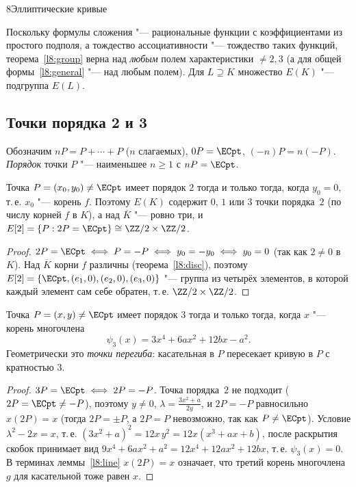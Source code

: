 \begin{lecture}{8}{Эллиптические кривые}
\begin{remark}
Поскольку формулы сложения "--- рациональные функции с коэффициентами из простого подполя,
а тождество ассоциативности "--- тождество таких функций, теорема~\ref{l8:group} верна над
\emph{любым} полем характеристики $\ne 2, 3$ (а для общей формы~\eqref{l8:general} "--- над любым
полем). Для $L \supseteq K$ множество $E(K)$ "--- подгруппа $E(L)$.
\end{remark}


\subsection{Точки порядка 2 и 3}

Обозначим $nP = P + \cdots + P$ ($n$ слагаемых), $0P = \ECpt$, $(-n)P = n(-P)$. \emph{Порядок}
точки $P$ "--- наименьшее $n \ge 1$ с $nP = \ECpt$.

\begin{proposition}\label{l8:order2}
Точка $P = (x_0, y_0) \ne \ECpt$ имеет порядок $2$ тогда и только тогда, когда $y_0 = 0$, т.\,е.
$x_0$ "--- корень $f$. Поэтому $E(K)$ содержит $0$, $1$ или $3$ точки порядка~$2$ (по числу корней
$f$ в $K$), а над $\overline K$ "--- ровно три, и
$E[2] = \{P : 2P = \ECpt\} \cong \ZZ/2 \times \ZZ/2$.
\end{proposition}

\begin{proof}
$2P = \ECpt \iff P = -P \iff y_0 = -y_0 \iff y_0 = 0$ (так как $2 \ne 0$ в $K$). Над $\overline K$
корни $f$ различны (теорема~\ref{l8:disc}), поэтому $E[2] = \{\ECpt, (e_1, 0), (e_2, 0), (e_3, 0)\}$
"--- группа из четырёх элементов, в которой каждый элемент сам себе обратен, т.\,е.
$\ZZ/2 \times \ZZ/2$.
\end{proof}

\begin{proposition}\label{l8:order3}
Точка $P = (x, y) \ne \ECpt$ имеет порядок $3$ тогда и только тогда, когда $x$ "--- корень
многочлена
\[
  \psi_3(x) = 3x^4 + 6ax^2 + 12bx - a^2.
\]
Геометрически это \emph{точки перегиба}: касательная в $P$ пересекает кривую в $P$
с кратностью $3$.
\end{proposition}

\begin{proof}
$3P = \ECpt \iff 2P = -P$. Точка порядка~$2$ не подходит ($2P = \ECpt \ne -P$), поэтому $y \ne 0$,
$\lambda = \frac{3x^2 + a}{2y}$, и $2P = -P$ равносильно $x(2P) = x$ (тогда $2P = \pm P$, а
$2P = P$ невозможно, так как $P \ne \ECpt$). Условие $\lambda^2 - 2x = x$, т.\,е.
$(3x^2 + a)^2 = 12x\,y^2 = 12x(x^3 + ax + b)$, после раскрытия скобок принимает вид
$9x^4 + 6ax^2 + a^2 = 12x^4 + 12ax^2 + 12bx$, т.\,е. $\psi_3(x) = 0$. В терминах леммы~\ref{l8:line}
$x(2P) = x$ означает, что третий корень многочлена $g$ для касательной тоже равен $x$.
\end{proof}


\end{lecture}

